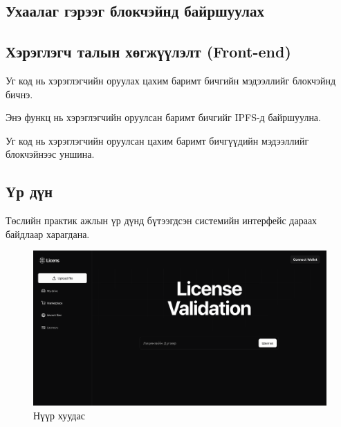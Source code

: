 \subsection{Ухаалаг гэрээг блокчэйнд байршуулах}


\subsection{Хэрэглэгч талын хөгжүүлэлт (Front-end)}
Уг код нь хэрэглэгчийн оруулах цахим баримт бичгийн мэдээллийг блокчэйнд бичнэ.


Энэ функц нь хэрэглэгчийн оруулсан баримт бичгийг IPFS-д байршуулна.


Уг код нь хэрэглэгчийн оруулсан цахим баримт бичгүүдийн мэдээллийг блокчэйнээс уншина.



\pagebreak
\subsection{Үр дүн}
Төслийн практик ажлын үр дүнд бүтээгдсэн  системийн интерфейс дараах байдлаар харагдана.
\begin{figure}[h!]
	\centering
	\includegraphics[scale=0.155]{src/images/homepage.png}
	\caption{Нүүр хуудас}
\end{figure}

